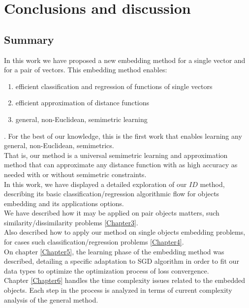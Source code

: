 
\chapter{Conclusions and discussion} %

\label{Chapter9} 

\section{Summary}

In this work we have proposed a new embedding method for a single vector and for a pair
of vectors. This embedding method enables: 
\begin{enumerate}
	\item efficient classification and regression of functions of single vectors
	\item efficient approximation of distance functions
	\item general, non-Euclidean, semimetric learning
\end{enumerate}.
For the best of our knowledge, this is the first work that enables learning any general, non-Euclidean, semimetrics.\\ 
That is, our method is a universal semimetric learning and approximation method that can approximate any distance function with as high accuracy as needed with or without semimetric constraints.\\
In this work, we have displayed a detailed exploration of our $ID$ method, describing its basic classification/regression algorithmic flow for objects embedding and its applications options.\\

We have described how it may be applied on pair objects matters, such similarity/dissimilarity problems \ref{Chapter3}.\\

Also described how to apply our method on single objects embedding problems, for cases such classification/regression problems \ref{Chapter4}.\\

On chapter \ref{Chapter5}, the learning phase of the embedding method was described, detailing a specific adaptation to SGD \cite{SGD} algorithm in order to fit our data types to optimize the optimization process of loss convergence.\\

Chapter \ref{Chapter6} handles the time complexity issues related to the embedded objects. Each step in the process is analyzed in terms of current complexity analysis of the general method.\\

